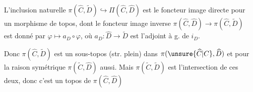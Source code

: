  L'inclusion naturelle $\pi(\widehat C,\widetilde D)\hookrightarrow\Pi(\widehat C,\widehat D)$  est le foncteur image directe pour un morphisme de topos, dont le foncteur image inverse  $\pi(\widehat C,\widehat D)\longrightarrow\pi(\widehat C,\widetilde D)$ est donné par $\varphi\longmapsto a_D\circ\varphi$, où $a_D\colon\widehat D\longrightarrow\widetilde D$ est l'adjoint à g. de $i_D$.

Donc $\pi(\widehat C,\widetilde D)$ est un sous-topos (str. plein) dans $\pi(\unsure{\widehat C|C},\widehat D)$ et pour la raison symétrique $\pi(\widetilde C,\widehat D)$ aussi. Mais $\pi(\widetilde C,\widetilde D)$ est l'intersection de ces deux, donc c'est un topos de $\pi(\widehat C,\widehat D)$

